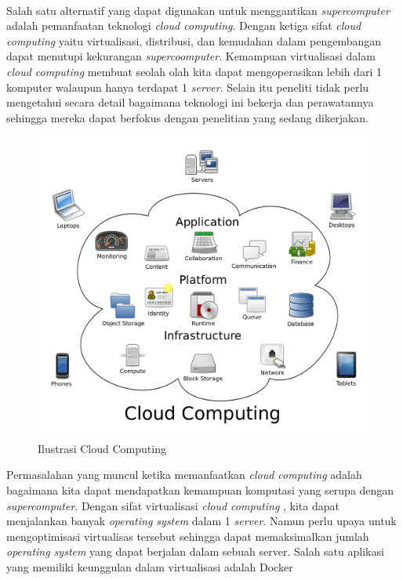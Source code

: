 \\
Salah satu alternatif yang dapat digunakan untuk menggantikan \textit{supercomputer} adalah pemanfaatan teknologi \textit{cloud computing}. Dengan ketiga sifat \textit{cloud computing} yaitu virtualisasi, distribusi, dan kemudahan dalam pengembangan dapat menutupi kekurangan \textit{supercoomputer}. Kemampuan virtualisasi dalam \textit{cloud computing} membuat seolah olah kita dapat mengoperasikan lebih dari 1 komputer walaupun hanya terdapat 1 \textit{server}. Selain itu peneliti tidak perlu mengetahui secara detail bagaimana teknologi ini bekerja dan perawatannya sehingga mereka dapat berfokus dengan penelitian yang sedang dikerjakan.
\begin{figure}
	\centering
	\includegraphics[scale=0.1]{cloud_computing.png}
	\caption{Ilustrasi Cloud Computing}
\end{figure}
Permasalahan yang muncul ketika memanfaatkan \textit{cloud computing} adalah bagaimana kita dapat mendapatkan kemampuan komputasi yang serupa dengan \textit{supercomputer}. Dengan sifat virtualisasi \textit{cloud computing} , kita dapat menjalankan banyak \textit{operating system} dalam 1 \textit{server}. Namun perlu upaya untuk mengoptimisasi virtualisas tersebut sehingga dapat memaksimalkan jumlah \textit{operating system } yang dapat berjalan dalam sebuah server. Salah satu aplikasi yang memiliki keunggulan dalam virtualisasi adalah Docker
